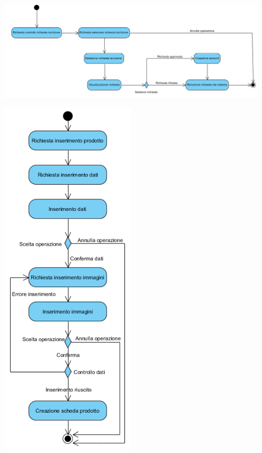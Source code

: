 \begin{center}
	\includegraphics[width=\textwidth]{assets/visualParadigm/attivita/approvazioneIscrizione}
\end{center}

\begin{center}
	\includegraphics[width=0.5\textwidth]{assets/visualParadigm/attivita/schedaprodotto}
\end{center}

